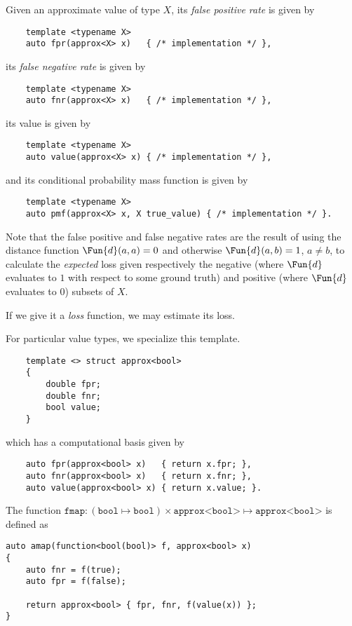 \documentclass[ ../main.tex]{subfiles}
\begin{document}
Given an approximate value of type $X$, its \emph{false positive rate} is given by
\begin{verbatim}
	template <typename X>
	auto fpr(approx<X> x)   { /* implementation */ },
\end{verbatim}
its \emph{false negative rate} is given by
\begin{verbatim}
	template <typename X>
	auto fnr(approx<X> x)   { /* implementation */ },
\end{verbatim}
its value is given by
\begin{verbatim}
	template <typename X>
	auto value(approx<X> x) { /* implementation */ },
\end{verbatim}
and its conditional probability mass function is given by
\begin{verbatim}
	template <typename X>
	auto pmf(approx<X> x, X true_value) { /* implementation */ }.
\end{verbatim}

Note that the false positive and false negative rates are the result of using the distance function $\Fun{d}(a,a) = 0$ and otherwise $\Fun{d}(a,b) = 1$, $a \neq b$, to calculate the \emph{expected} loss given respectively the negative (where $\Fun{d}$ evaluates to $1$ with respect to some ground truth) and positive (where $\Fun{d}$ evaluates to $0$) subsets of $X$.

If we give it a \emph{loss} function, we may estimate its loss.


For particular value types, we specialize this template.
\begin{verbatim}
	template <> struct approx<bool>
	{
		double fpr;
		double fnr;
		bool value;
	}
\end{verbatim}
which has a computational basis given by
\begin{verbatim}
	auto fpr(approx<bool> x)   { return x.fpr; },
	auto fnr(approx<bool> x)   { return x.fnr; },
	auto value(approx<bool> x) { return x.value; }.
\end{verbatim}


The function $\texttt{fmap} \colon (\texttt{bool} \mapsto \texttt{bool}) \times \texttt{approx<bool>} \mapsto \texttt{approx<bool>}$ is defined as
\begin{verbatim}
auto amap(function<bool(bool)> f, approx<bool> x)
{
	auto fnr = f(true);
	auto fpr = f(false);

	return approx<bool> { fpr, fnr, f(value(x)) };
}
\end{verbatim}
\end{document}

